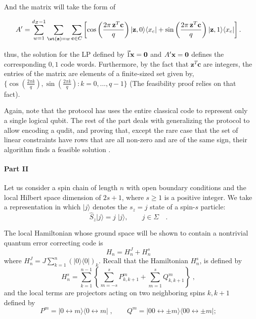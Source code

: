\documentclass{article}
\begin{document}
And the matrix will take the form of  

\begin{equation}
A'=\sum_{w=1}^{d_Z-1}
\sum_{\wt({\bf z}) = w}
\sum_{{\bf c}\in{C}}
\left[
\cos\left(\frac{2\pi\,{\bf z}^{T}{\bf c}}{q}\right)|{\bf z},0\rangle\langle{x_c}|+
\sin\left(\frac{2\pi\,{\bf z}^{T}{\bf c}}{q}\right)|{\bf z},1\rangle\langle{x_c}|
\right].
 \label{eq:Aprime}
\end{equation} 

thus, the solution for the LP defined by \( \vec{1}\bf x = 0 \) and  \( A^\prime  \bf x = 0 \) defines the corresponding \(0,1\) code words. Furthermore, by the fact that \( \mathbf{z}^T\mathbf{c}\) are integers, the entries of the matrix are elements of a finite-sized set given by, \( \{\cos(\frac{2\pi k}{q}) , \sin(\frac{2\pi k}{q}) : k = 0, . . . , q - 1 \}\) (The feasibility proof relies on that fact).   

Again, note that the protocol has uses the entire classical code to represent only a single logical qubit. The rest of the part deals with generalizing the protocol to allow encoding a qudit, and proving that, except the rare case that the set of linear constraints have rows that are all non-zero and are of the same sign, their algorithm finds a feasible solution . 


\paragraph{Part II}

Let us consider a spin chain of length
$n$ with open boundary conditions and the local Hilbert space dimension of $2s+1$, where $s\ge1$
is a positive integer. We take a representation in which $|j\rangle$
denotes the $s_{z}=j$ state of a spin-$s$ particle:
\[
\hat{S}_{z}|j\rangle=j\;|j\rangle,\qquad j\in\Sigma\quad.
\]

The local Hamiltonian whose ground space will be shown to contain a nontrivial quantum
error correcting code is
\begin{equation}
H_{n}=H_{n}^{J}+H_{n}^{s}\label{eq:H}
\end{equation}
where \(H_{n}^{J}=J\sum_{k=1}^{n}\left(|0\rangle\langle0|\right)_{k}\).
Recall that the Hamiltonian \(H_{n}^{s}\), is defined by
\begin{equation}
H_{n}^{s}=\sum_{k=1}^{n-1}\left\{ \sum_{m=-s}^{s}P_{k,k+1}^{m}+\sum_{m=1}^{s}Q_{k,k+1}^{m}\right\} \;,\label{eq:Hn_s-2}
\end{equation}
and the local terms are projectors acting on two neighboring spins \(k,k+1\) defined by 
\begin{equation}
P^{m}=|0\leftrightarrow m\rangle\langle0\leftrightarrow m|\;,\qquad Q^{m}=|00\leftrightarrow\pm m\rangle\langle00\leftrightarrow\pm m|;\label{eq:hs_Proj}
\end{equation}
\end{document}
